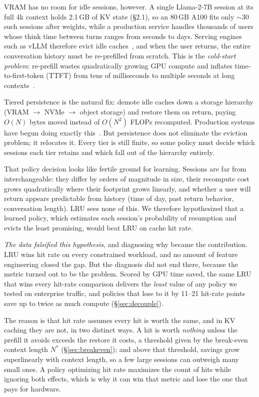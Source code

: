 \documentclass[letterpaper,twocolumn,10pt]{article}
\begin{document}
VRAM has no room for idle sessions, however. A single Llama-2-7B session at its full 4k context holds 2.1\,GB of KV state (\S2.1), so an 80\,GB A100 fits only ${\sim}30$ such sessions after weights, while a production service handles thousands of users whose think time between turns ranges from seconds to days. Serving engines such as vLLM therefore evict idle caches~\cite{kwon2023pagedattention}, and when the user returns, the entire conversation history must be re-prefilled from scratch. This is the \emph{cold-start problem}: re-prefill wastes quadratically growing GPU compute and inflates time-to-first-token (TTFT) from tens of milliseconds to multiple seconds at long contexts~\cite{liu2024cachegen}.

Tiered persistence is the natural fix: demote idle caches down a storage hierarchy (VRAM $\to$ NVMe $\to$ object storage) and restore them on return, paying $O(N)$ bytes moved instead of $O(N^2)$ FLOPs recomputed. Production systems have begun doing exactly this~\cite{gao2024cachedattention,qin2025mooncake,zhong2024lmcache}. But persistence does not eliminate the eviction problem; it relocates it. Every tier is still finite, so some policy must decide which sessions each tier retains and which fall out of the hierarchy entirely.

That policy decision looks like fertile ground for learning. Sessions are far from interchangeable: they differ by orders of magnitude in size, their recompute cost grows quadratically where their footprint grows linearly, and whether a user will return appears predictable from history (time of day, past return behavior, conversation length). LRU sees none of this. We therefore hypothesized that a learned policy, which estimates each session's probability of resumption and evicts the least promising, would beat LRU on cache hit rate.

\emph{The data falsified this hypothesis}, and diagnosing why became the contribution. LRU wins hit rate on every constrained workload, and no amount of feature engineering closed the gap. But the diagnosis did not end there, because the metric turned out to be the problem. Scored by GPU time saved, the same LRU that wins every hit-rate comparison delivers the \emph{least} value of any policy we tested on enterprise traffic, and policies that lose to it by 11--21 hit-rate points save up to twice as much compute (\S\ref{sec:decouple}).

The reason is that hit rate assumes every hit is worth the same, and in KV caching they are not, in two distinct ways. A hit is worth \emph{nothing} unless the prefill it avoids exceeds the restore it costs, a threshold given by the break-even context length $N^{*}$ (\S\ref{sec:breakeven}); and above that threshold, savings grow superlinearly with context length, so a few large sessions can outweigh many small ones. A policy optimizing hit rate maximizes the count of hits while ignoring both effects, which is why it can win that metric and lose the one that pays for hardware.
\end{document}
